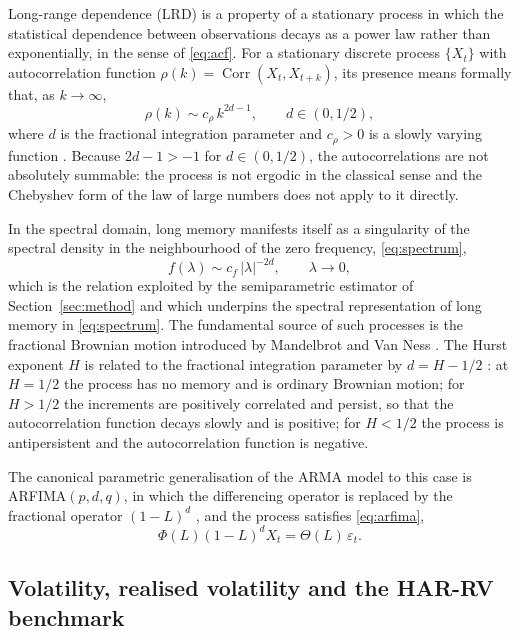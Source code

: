 \documentclass[journal]{IEEEtran}
\begin{document}
Long-range dependence (LRD) is a property of a stationary process in which the statistical
dependence between observations decays as a power law rather than exponentially, in the sense of
\eqref{eq:acf}. For a stationary
discrete process $\{X_t\}$ with autocorrelation function $\rho(k)=\operatorname{Corr}(X_t,X_{t+k})$,
its presence means formally that, as $k\to\infty$,
\begin{equation}\label{eq:acf}
\rho(k)\sim c_\rho\, k^{2d-1},\qquad d\in(0,1/2),
\end{equation}
where $d$ is the fractional integration parameter and $c_\rho>0$ is a slowly varying function
\cite{beran1994statistics,palma2007long}. Because $2d-1>-1$ for $d\in(0,1/2)$, the
autocorrelations are not absolutely summable: the process is not ergodic in the classical sense
and the Chebyshev form of the law of large numbers does not apply to it directly.

In the spectral domain, long memory manifests itself as a singularity of the spectral density in
the neighbourhood of the zero frequency, \eqref{eq:spectrum},
\begin{equation}\label{eq:spectrum}
f(\lambda)\sim c_f\,|\lambda|^{-2d},\qquad \lambda\to 0,
\end{equation}
which is the relation exploited by the semiparametric estimator of Section~\ref{sec:method}
and which underpins the spectral representation of long memory in \eqref{eq:spectrum}. The
fundamental source of such processes is the fractional Brownian motion introduced by Mandelbrot and
Van Ness \cite{mandelbrot1968fractional}. The Hurst exponent $H$ is related to the fractional
integration parameter by $d=H-1/2$ \cite{hurst1951long,pipiras2017long}: at $H=1/2$ the process has
no memory and is ordinary Brownian motion; for $H>1/2$ the increments are positively correlated and
persist, so that the autocorrelation function decays slowly and is positive; for $H<1/2$ the
process is antipersistent and the autocorrelation function is negative.

The canonical parametric generalisation of the ARMA model to this case is ARFIMA$(p,d,q)$, in
which the differencing operator is replaced by the fractional operator $(1-L)^d$
\cite{granger1980long,hosking1981fractional}, and the process satisfies \eqref{eq:arfima},
\begin{equation}\label{eq:arfima}
\Phi(L)(1-L)^d X_t=\Theta(L)\,\varepsilon_t.
\end{equation}

\subsection{Volatility, realised volatility and the HAR-RV benchmark}
\end{document}
